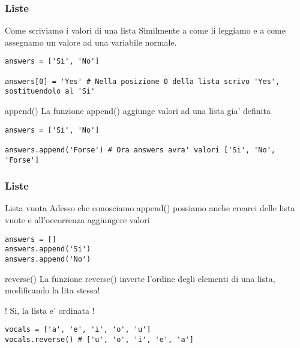 \begin{frame}[fragile]
\frametitle{Liste}
    \begin{block}{Come scriviamo i valori di una lista}
Similmente a come li leggiamo e a come assegnamo un valore ad una variabile normale.
    \end{block}
    
    \begin{lstlisting}
answers = ['Si', 'No']

answers[0] = 'Yes' # Nella posizione 0 della lista scrivo 'Yes', sostituendolo al 'Si'
    \end{lstlisting}

    \begin{block}{append()}
La funzione append() aggiunge valori ad una lista gia' definita
    \end{block}

    \begin{lstlisting}
answers = ['Si', 'No']

answers.append('Forse') # Ora answers avra' valori ['Si', 'No', 'Forse']
    \end{lstlisting}

\end{frame}

\begin{frame}[fragile]
\frametitle{Liste}
    \begin{block}{Lista vuota}
Adesso che conosciamo append() possiamo anche crearci delle lista vuote e all'occorrenza aggiungere valori
    \end{block}
    
    \begin{lstlisting}
answers = []
answers.append('Si')
answers.append('No')
    \end{lstlisting}

    \begin{block}{reverse()}
La funzione reverse() inverte l'ordine degli elementi di una lista, modificando la lita stessa!

! Si, la lista e' ordinata !
    \end{block}

    \begin{lstlisting}
vocals = ['a', 'e', 'i', 'o', 'u']
vocals.reverse() # ['u', 'o', 'i', 'e', 'a']
    \end{lstlisting}

\end{frame}

